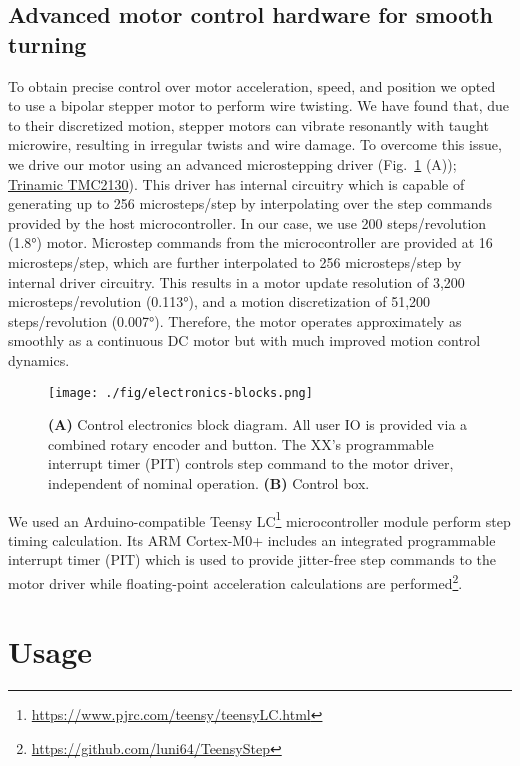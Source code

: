 \documentclass[11pt,a4paper]{article}
\begin{document}
\subsection{Advanced motor control hardware for smooth turning} 
To obtain precise control over motor acceleration, speed, and position we opted
to use a bipolar stepper motor to perform wire twisting. We have found that,
due to their discretized motion, stepper motors can vibrate resonantly with
taught microwire, resulting in irregular twists and wire damage. To overcome
this issue, we drive our motor using an advanced microstepping driver
(Fig.~\ref{f:ctrl-box} (A));
\href{https://www.trinamic.com/products/integrated-circuits/details/tmc2100/}{Trinamic
TMC2130}). This driver has internal circuitry which is capable of generating up
to 256 microsteps/step by interpolating over the step commands provided by the
host microcontroller. In our case, we use 200 steps/revolution (\ang{1.8})
motor. Microstep commands from the microcontroller are provided at 16
microsteps/step, which are further interpolated to 256 microsteps/step by
internal driver circuitry. This results in a motor update resolution of 3,200
microsteps/revolution (\ang{0.113}), and a motion discretization of 51,200
steps/revolution (\ang{0.007}). Therefore, the motor operates approximately as
smoothly as a continuous DC motor but with much improved motion control
dynamics.

\begin{figure}
\centering
\texttt{[image: ./fig/electronics-blocks.png]}
\caption{\textbf{(A)} Control electronics block diagram. All user IO is
    provided via a combined rotary encoder and button. The XX's programmable
    interrupt timer (PIT) controls step command to the motor driver, independent of
    nominal operation. \textbf{(B)} Control box.}
\label{f:ctrl-box}
\end{figure}

We used an Arduino-compatible Teensy
LC\footnote{\url{https://www.pjrc.com/teensy/teensyLC.html}} microcontroller
module perform step timing calculation. Its ARM Cortex-M0+ includes an
integrated programmable interrupt timer (PIT) which is used to provide
jitter-free step commands to the motor driver while floating-point acceleration
calculations are
performed\footnote{\url{https://github.com/luni64/TeensyStep}}.

\section{Usage}
\end{document}
